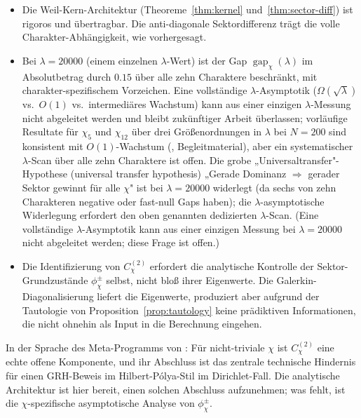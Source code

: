 \documentclass[10pt,twocolumn]{article}
\theoremstyle{definition}
\theoremstyle{remark}
\newcommand{\gap}{\operatorname{gap}}
\newcommand{\chifn}{\chi}
\begin{document}
\begin{itemize}
  \item[(I1)] Die Weil-Kern-Architektur (Theoreme~\ref{thm:kernel}
    und~\ref{thm:sector-diff}) ist rigoros und übertragbar. Die
    anti-diagonale Sektordifferenz trägt die volle Charakter-Abhängigkeit,
    wie vorhergesagt.
  \item[(I2)] Bei $\lambda=20000$ (einem einzelnen $\lambda$-Wert) ist der
    Gap $\gap_{\chifn}(\lambda)$ im Absolutbetrag durch $0.15$ über alle
    zehn Charaktere beschränkt, mit charakter-spezifischem Vorzeichen.
    Eine vollständige $\lambda$-Asymptotik ($\Omega(\sqrt{\lambda})$
    vs.\ $O(1)$ vs.\ intermediäres Wachstum) kann aus einer einzigen
    $\lambda$-Messung nicht abgeleitet werden und bleibt zukünftiger
    Arbeit überlassen; vorläufige Resultate für $\chifn_5$ und
    $\chifn_{12}$ über drei Größenordnungen in $\lambda$ bei $N=200$ sind
    konsistent mit $O(1)$-Wachstum (\cite{AsymptoticScan},
    Begleitmaterial), aber ein systematischer $\lambda$-Scan über alle
    zehn Charaktere ist offen. Die grobe
    „Universaltransfer"-Hypothese (universal transfer hypothesis)
    „Gerade Dominanz $\Rightarrow$ gerader Sektor gewinnt für alle
    $\chifn$" ist bei $\lambda=20000$ widerlegt (da sechs von zehn
    Charakteren negative oder fast-null Gaps haben); die
    $\lambda$-asymptotische Widerlegung erfordert den oben genannten
    dedizierten $\lambda$-Scan. (Eine vollständige $\lambda$-Asymptotik
    kann aus einer einzigen Messung bei $\lambda=20000$ nicht abgeleitet
    werden; diese Frage ist offen.)
  \item[(I3)] Die Identifizierung von $C^{(2)}_{\chifn}$ erfordert die analytische
    Kontrolle der Sektor-Grundzustände $\phi^\pm_{\chifn}$
    selbst, nicht bloß ihrer Eigenwerte. Die Galerkin-Diagonalisierung
    liefert die Eigenwerte, produziert aber aufgrund der Tautologie
    von Proposition~\ref{prop:tautology} keine prädiktiven
    Informationen, die nicht ohnehin als Input in die Berechnung eingehen.
\end{itemize}

In der Sprache des Meta-Programms von \cite{MetaGalerkinBridge}: Für
nicht-triviale $\chifn$ ist $C^{(2)}_{\chifn}$ eine echte offene
Komponente, und ihr Abschluss ist das zentrale technische Hindernis für einen
GRH-Beweis im Hilbert-P\'olya-Stil im Dirichlet-Fall. Die
analytische Architektur ist hier bereit, einen solchen Abschluss aufzunehmen; was
fehlt, ist die $\chifn$-spezifische asymptotische Analyse von
$\phi^\pm_{\chifn}$.
\end{document}
